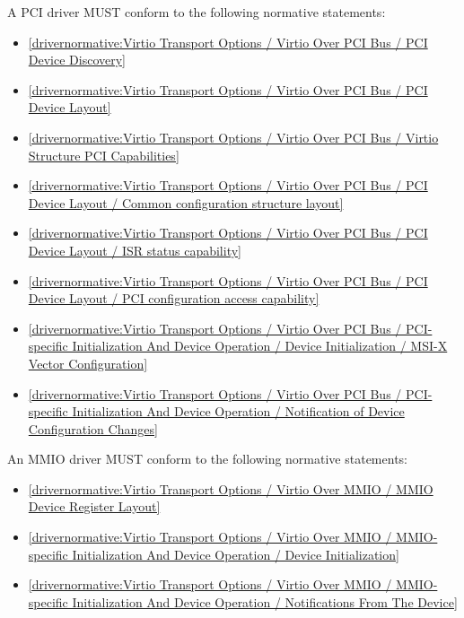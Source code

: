 \label{sec:Conformance / Driver Conformance / PCI Driver Conformance}

A PCI driver MUST conform to the following normative statements:

\begin{itemize}
\item \ref{drivernormative:Virtio Transport Options / Virtio Over PCI Bus / PCI Device Discovery}
\item \ref{drivernormative:Virtio Transport Options / Virtio Over PCI Bus / PCI Device Layout}
\item \ref{drivernormative:Virtio Transport Options / Virtio Over PCI Bus / Virtio Structure PCI Capabilities}
\item \ref{drivernormative:Virtio Transport Options / Virtio Over PCI Bus / PCI Device Layout / Common configuration structure layout}
\item \ref{drivernormative:Virtio Transport Options / Virtio Over PCI Bus / PCI Device Layout / ISR status capability}
\item \ref{drivernormative:Virtio Transport Options / Virtio Over PCI Bus / PCI Device Layout / PCI configuration access capability}
\item \ref{drivernormative:Virtio Transport Options / Virtio Over PCI Bus / PCI-specific Initialization And Device Operation / Device Initialization / MSI-X Vector Configuration}
\item \ref{drivernormative:Virtio Transport Options / Virtio Over PCI Bus / PCI-specific Initialization And Device Operation / Notification of Device Configuration Changes}
\end{itemize}

\label{sec:Conformance / Driver Conformance / MMIO Driver Conformance}

An MMIO driver MUST conform to the following normative statements:

\begin{itemize}
\item \ref{drivernormative:Virtio Transport Options / Virtio Over MMIO / MMIO Device Register Layout}
\item \ref{drivernormative:Virtio Transport Options / Virtio Over MMIO / MMIO-specific Initialization And Device Operation / Device Initialization}
\item \ref{drivernormative:Virtio Transport Options / Virtio Over MMIO / MMIO-specific Initialization And Device Operation / Notifications From The Device}
\end{itemize}


